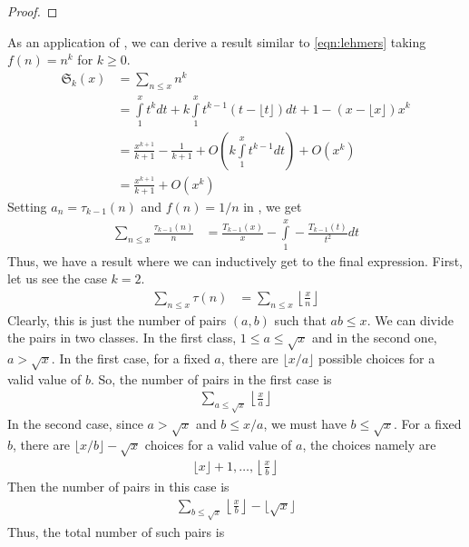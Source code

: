 \documentclass[elemannt.tex]{subfile}
\begin{document}
		\begin{proof}

		\end{proof}
	As an application of , we can derive a result similar to \ref{eqn:lehmers} taking  $f(n)=n^{k}$ for $k\geq 0$.
		\begin{align*}
			\mathfrak{S}_{k}(x)
				& = \sum_{n\leq x}n^{k}\\
				& = \int\limits_{1}^{x}t^{k}dt+k\int\limits_{1}^{x}t^{k-1}(t-\lfloor{t}\rfloor)dt+1-(x-\lfloor{x}\rfloor)x^{k}\\
				& = \frac{x^{k+1}}{k+1}-\frac{1}{k+1}+O\left(k\int\limits_{1}^{x}t^{k-1}dt\right)+O(x^{k})\\
				& = \frac{x^{k+1}}{k+1}+O(x^{k})
		\end{align*}
	Setting $a_{n}=\tau_{k-1}(n)$ and $f(n)=1/n$ in , we get
		\begin{align*}
			\sum_{n\leq x}\frac{\tau_{k-1}(n)}{n}
				& = \frac{T_{k-1}(x)}{x}-\int\limits_{1}^{x}-\frac{T_{k-1}(t)}{t^{2}}dt
		\end{align*}
	Thus, we have a result where we can inductively get to the final expression. First, let us see the case $k=2$.
		\begin{align*}
			\sum_{n\leq x}\tau(n)
				& = \sum_{n\leq x}\left\lfloor{\frac{x}{n}}\right\rfloor
		\end{align*}
	Clearly, this is just the number of pairs $(a,b)$ such that $ab\leq x$. We can divide the pairs in two classes. In the first class, $1\leq a\leq \sqrt{x}$ and in the second one, $a>\sqrt{x}$. In the first case, for a fixed $a$, there are $\lfloor{x/a}\rfloor$ possible choices for a valid value of $b$. So, the number of pairs in the first case is
		\begin{align*}
			\sum_{a\leq \sqrt{x}}\left\lfloor{\frac{x}{a}}\right\rfloor
		\end{align*}
	In the second case, since $a>\sqrt{x}$ and $b\leq x/a$, we must have $b\leq \sqrt{x}$. For a fixed $b$, there are $\lfloor{x/b}\rfloor-\sqrt{x}$ choices for a valid value of $a$, the choices namely are
		\begin{align*}
			\lfloor{x}\rfloor+1,\ldots,\left\lfloor{\frac{x}{b}}\right\rfloor
		\end{align*}
	Then the number of pairs in this case is
		\begin{align*}
			\sum_{b\leq \sqrt{x}}\left\lfloor{\frac{x}{b}}\right\rfloor-\lfloor{\sqrt{x}}\rfloor
		\end{align*}
	Thus, the total number of such pairs is
\end{document}
